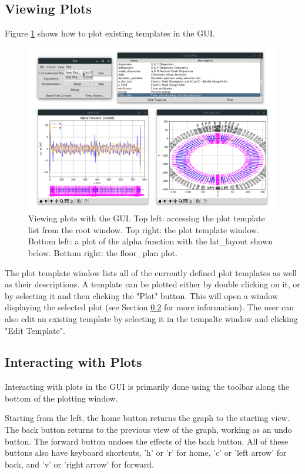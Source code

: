 \subsection{Viewing Plots}
\label{s:gui.plot.view}
Figure \ref{fig:gui.plot.view} shows how to plot existing templates in the GUI.
\begin{figure}
\centering
\includegraphics[width=12cm]{figures/view_plot.png}
\caption{Viewing plots with the GUI.
Top left: accessing the plot template list from the root window.
Top right: the plot template window.
Bottom left: a plot of the alpha function with the lat_layout shown below.
Bottom right: the floor_plan plot.}
\label{fig:gui.plot.view}
\end{figure}
The plot template window lists all of the currently defined plot templates as well as their descriptions.
A template can be plotted either by double clicking on it, or by selecting it and then clicking the "Plot" button.
This will open a window displaying the selected plot (see Section \ref{s:gui.plot.interaction} for more information).
The user can also edit an existing template by selecting it in the tempalte window and clicking "Edit Template".


\subsection{Interacting with Plots}
\label{s:gui.plot.interaction}
Interacting with plots in the GUI is primarily done using the toolbar along the bottom of the plotting window.

Starting from the left, the home button returns the graph to the starting view. The back button returns to the previous view of the graph, working as an undo button. The forward button undoes the effects of the back button. All of these buttons also have keyboard shortcuts, 'h' or 'r' for home, 'c' or 'left arrow' for back, and 'v' or 'right arrow' for forward.

